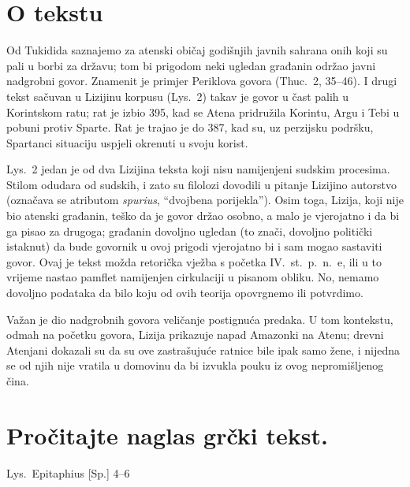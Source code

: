 

\section*{O tekstu}

Od Tukidida saznajemo za atenski običaj godišnjih javnih sahrana onih koji su pali u borbi za državu; tom bi prigodom neki ugledan građanin održao javni nadgrobni govor. Znamenit je primjer Periklova govora (Thuc.~2, 35–46). I drugi tekst sačuvan u Lizijinu korpusu (Lys.~2) takav je govor u čast palih u Korintskom ratu; rat je izbio 395, kad se Atena pridružila Korintu, Argu i Tebi u pobuni protiv Sparte. Rat je trajao je do 387, kad su, uz perzijsku podršku, Spartanci situaciju uspjeli okrenuti u svoju korist.

Lys.~2 jedan je od dva Lizijina teksta koji nisu namijenjeni sudskim procesima. Stilom odudara od sudskih, i zato su filolozi dovodili u pitanje Lizijino autorstvo (označava se atributom \textit{spurius}, ``dvojbena porijekla''). Osim toga, Lizija, koji nije bio atenski građanin, teško da je govor držao osobno, a malo je vjerojatno i da bi ga pisao za drugoga; građanin dovoljno ugledan (to znači, dovoljno politički istaknut) da bude govornik u ovoj prigodi vjerojatno bi i sam mogao sastaviti govor. Ovaj je tekst možda retorička vježba s početka IV.~st.\ p.~n.~e, ili u to vrijeme nastao pamflet namijenjen cirkulaciji u pisanom obliku. No, nemamo dovoljno podataka da bilo koju od ovih teorija opovrgnemo ili potvrdimo.

Važan je dio nadgrobnih govora veličanje postignuća predaka. U tom kontekstu, odmah na početku govora, Lizija prikazuje napad Amazonki na Atenu; drevni Atenjani dokazali su da su ove zastrašujuće ratnice bile ipak samo žene, i nijedna se od njih nije vratila u domovinu da bi izvukla pouku iz ovog nepromišljenog čina.


\newpage

\section*{Pročitajte naglas grčki tekst.}

Lys.\ Epitaphius [Sp.] 4–6


\medskip



